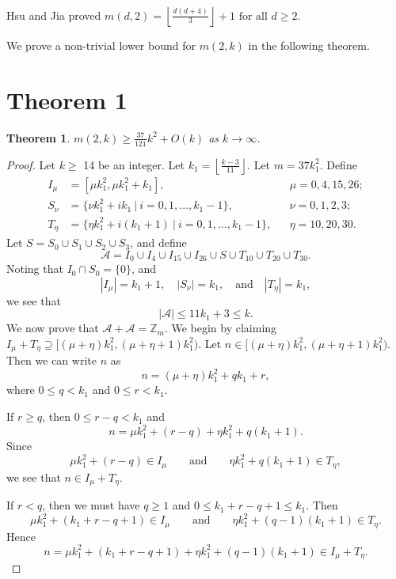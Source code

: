 \documentclass[11pt]{article}
\newtheorem{theorem}{Theorem}
\theoremstyle{definition}
\def\Z{\mbox{$\mathbb Z$}}
\begin{document}
Hsu and Jia proved $m(d,2) =\left \lfloor \frac{d(d+4)}{3}\right \rfloor+1 \text{ for all } d\geq2$. \cite{JiaHsu}


We prove a non-trivial lower bound for $m(2,k)$ in the following theorem.

 
\section{Theorem 1}
 
\begin{theorem}
$\displaystyle m(2,k) \geq \frac{37}{121}k^2 + O(k)$  as $ k \to \infty$.
\end{theorem}

\begin{proof}
Let $k \geq$ 14 be an integer. Let $\displaystyle k_1 = \left \lfloor \frac{k - 3}{11} \right \rfloor$. Let $m = 37k_1^2$.  Define 
\begin{align*}
I_\mu &= [\mu k_1^2, \mu k_1^2 + k_1],
&&\mu = 0, 4, 15, 26; \\
S_\nu &= \{\nu k_1^2 + ik_1 \ |\  i = 0 , 1, ... , k_1 - 1\},
&&\nu = 0, 1, 2, 3;\\
T_{\eta} &= \{\eta k_1^2+ i(k_1 + 1) \ |\   i = 0 , 1, ... , k_1 -1\},
&&\eta = 10, 20, 30.
\end{align*}
 Let $S= S_{0} \cup S_{1} \cup S_{2} \cup S_{3}$, and
define
\[
\mathcal{A}=I_0\cup I_4\cup I_{15}\cup I_{26}\cup S\cup T_{10}\cup T_{20}\cup T_{30}.
\]
Noting  that $I_0\cap S_0=\{0\}$, and 
\[
|I_\mu| = k_1 + 1,\quad 
|S_\nu| = k_1,\quad\text{and}\quad
|T_\eta| = k_1,
\]
we see that 
\[
|\mathcal{A|} \leq 11k_1 + 3 \leq k.
\]  
We now prove that $\mathcal{A}+\mathcal{A}=\Z_m$.
We begin by claiming $I_{\mu}+T_{\eta}\supseteq[(\mu + \eta )k_1^2 ,  (\mu + \eta  + 1)k_1^2)$. Let $n \in[(\mu + \eta )k_1^2 ,  (\mu + \eta  + 1)k_1^2)$.
Then we can write $n$ as 
\[
n = (\mu + \eta ) k_1^2 + qk_1 + r,
\]
where $0 \leq q < k_1$ and $0 \leq r < k_1$.

If $r \geq q$, then $0\le r-q<k_{1}$ and
\[
n = \mu k_1^2 +  (r - q)+ \eta k_1^2 + q(k_1+1).
\]
 Since 
 \[
 \mu k_1^2 + (r - q) \in I_\mu\qquad\text{and}\qquad \eta k_1^2 +q(k_1+1) \in T_\eta,
 \]
we see that $n \in I_{\mu}+T_{\eta}$. 

If $r < q$, then we must have $q \geq 1$ and $0\le k_{1}+r-q+1\le k_{1}$. Then
\[
\mu k_1^2 + (k_1 + r - q + 1) \in I_\mu \qquad \text{and}\qquad
\eta k_1^2 + (q - 1)(k_1 + 1) \in T_\eta.
\]
 Hence
\[
n = \mu k_1^2 + (k_1 + r - q + 1)+\eta k_1^2 + (q - 1)(k_1 + 1) \in I_{\mu}+T_{\eta}.
\]
 


\end{proof}
\end{document}
